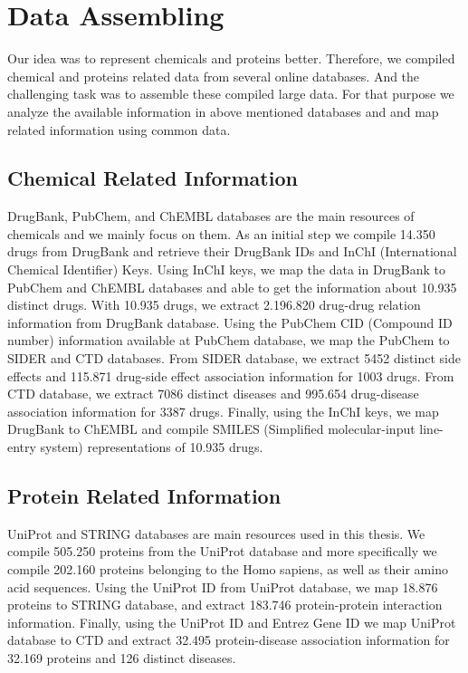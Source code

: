 \section{Data Assembling}
\label{section:data_assembling}
Our idea was to represent chemicals and proteins better. Therefore, we compiled chemical and proteins related data from several online databases. And the challenging task was to assemble these compiled large data. For that purpose we analyze the available information in above mentioned databases and and map related information using common data. 

\subsection{Chemical Related Information}
DrugBank, PubChem, and ChEMBL databases are the main resources of chemicals and we mainly focus on them. As an initial step we compile 14.350 drugs from DrugBank and retrieve their DrugBank IDs and InChI (International Chemical Identifier) Keys. Using InChI keys, we map the data in DrugBank to PubChem and ChEMBL databases and able to get the information about 10.935 distinct drugs. With 10.935 drugs, we extract 2.196.820 drug-drug relation information from DrugBank database. Using the PubChem CID (Compound ID number) information available at PubChem database, we map the PubChem to SIDER and CTD databases. From SIDER database, we extract 5452 distinct side effects and 115.871 drug-side effect association information for 1003 drugs. From CTD database, we extract 7086 distinct diseases and 995.654 drug-disease association information for 3387 drugs. Finally, using the InChI keys, we map DrugBank to ChEMBL and compile SMILES (Simplified molecular-input line-entry system) representations of 10.935 drugs. 

\subsection{Protein Related Information}
UniProt and STRING databases are main resources used in this thesis. We compile 505.250 proteins from the UniProt database and more specifically we compile 202.160 proteins belonging to the Homo sapiens, as well as their amino acid sequences. Using the UniProt ID from UniProt database, we map 18.876 proteins to STRING database, and extract 183.746 protein-protein interaction information. Finally, using the UniProt ID and Entrez Gene ID we map UniProt database to CTD and extract 32.495 protein-disease association information for 32.169 proteins and 126 distinct diseases.